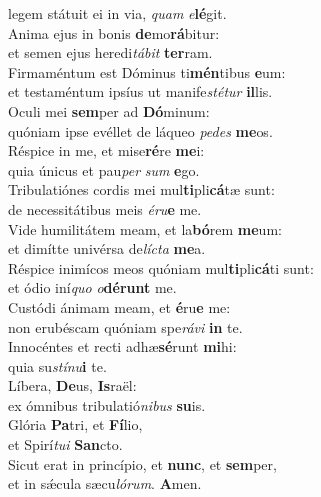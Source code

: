\oddverse legem státuit ei in via, \textit{quam} \textit{e}\textbf{lé}git.\\
\evenverse Anima ejus in bonis \textbf{de}mo\textbf{rá}bitur:~\*\\
\evenverse et semen ejus heredi\textit{tá}\textit{bit} \textbf{ter}ram.\\
\oddverse Firmaméntum est Dóminus ti\textbf{mén}tibus \textbf{e}um:~\*\\
\oddverse et testaméntum ipsíus ut manife\textit{sté}\textit{tur} \textbf{il}lis.\\
\evenverse Oculi mei \textbf{sem}per ad \textbf{Dó}minum:~\*\\
\evenverse quóniam ipse evéllet de láqueo \textit{pe}\textit{des} \textbf{me}os.\\
\oddverse Réspice in me, et mise\textbf{ré}re \textbf{me}i:~\*\\
\oddverse quia únicus et pau\textit{per} \textit{sum} \textbf{e}go.\\
\evenverse Tribulatiónes cordis mei mul\textbf{ti}pli\textbf{cá}tæ sunt:~\*\\
\evenverse de necessitátibus meis \textit{é}\textit{ru}\textbf{e} me.\\
\oddverse Vide humilitátem meam, et la\textbf{bó}rem \textbf{me}um:~\*\\
\oddverse et dimítte univérsa de\textit{lí}\textit{cta} \textbf{me}a.\\
\evenverse Réspice inimícos meos quóniam mul\textbf{ti}pli\textbf{cá}ti sunt:~\*\\
\evenverse et ódio iní\textit{quo} \textit{o}\textbf{dé}\textbf{runt} me.\\
\oddverse Custódi ánimam meam, et \textbf{é}ru\textbf{e} me:~\*\\
\oddverse non erubéscam quóniam spe\textit{rá}\textit{vi} \textbf{in} te.\\
\evenverse Innocéntes et recti adhæ\textbf{sé}runt \textbf{mi}hi:~\*\\
\evenverse quia su\textit{stí}\textit{nu}\textbf{i} te.\\
\oddverse Líbera, \textbf{De}us, \textbf{Is}raël:~\*\\
\oddverse ex ómnibus tribulatió\textit{ni}\textit{bus} \textbf{su}is.\\
\evenverse Glória \textbf{Pa}tri, et \textbf{Fí}lio,~\*\\
\evenverse et Spirí\textit{tu}\textit{i} \textbf{San}cto.\\
\oddverse Sicut erat in princípio, et \textbf{nunc}, et \textbf{sem}per,~\*\\
\oddverse et in sǽcula sæcu\textit{ló}\textit{rum}. \textbf{A}men.\\
